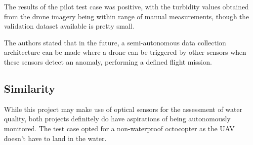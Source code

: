 The results of the pilot test case was positive, with the turbidity values obtained from the drone imagery being within range of manual measurements, though the validation dataset available is pretty small.

The authors stated that in the future, a semi-autonomous data collection architecture can be made where a drone can be triggered by other sensors when these sensors detect an anomaly, performing a defined flight mission.

\subsection{Similarity}
While this project may make use of optical sensors for the assessment of water quality, both projects definitely do have aspirations of being autonomously monitored. The test case opted for a non-waterproof octocopter as the UAV doesn't have to land in the water.
